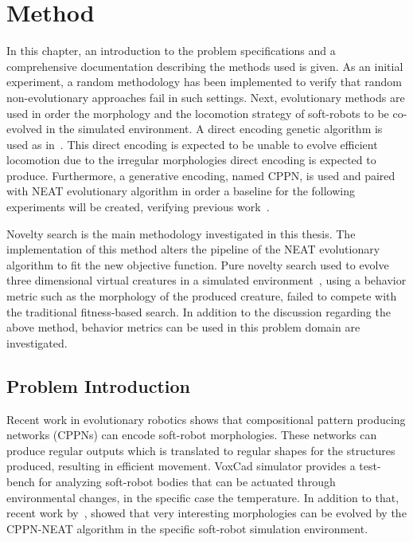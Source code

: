 
\chapter{Method} %

\label{Method} %



In this chapter, an introduction to the problem specifications and a comprehensive documentation describing the methods used is given. As an initial experiment, a random methodology has been implemented to verify that random non-evolutionary approaches fail in such settings. Next, evolutionary methods are used in order the morphology and the locomotion strategy of soft-robots to be co-evolved in the simulated environment. A direct encoding genetic algorithm is used as in~\citep{cheney2013unshackling}. This direct encoding is expected to be unable to evolve efficient locomotion due to the irregular morphologies direct encoding is expected to produce. Furthermore, a generative encoding, named CPPN, is used and paired with NEAT evolutionary algorithm in order a baseline for the following experiments will be created, verifying previous work~\citep{cheney2013unshackling}.

Novelty search is the main methodology investigated in this thesis. The implementation of this method alters the pipeline of the NEAT evolutionary algorithm to fit the new objective function. Pure novelty search used to evolve three dimensional virtual creatures in a simulated environment~\citep{lehman2011evolving}, using a behavior metric such as the morphology of the produced creature, failed to compete with the traditional fitness-based search. In addition to the discussion regarding the above method, behavior metrics can be used in this problem domain are investigated. 



\section{Problem Introduction}

Recent work in evolutionary robotics shows that compositional pattern producing networks (CPPNs) can encode soft-robot morphologies. These networks can produce regular outputs which is translated to regular shapes for the structures produced, resulting in efficient movement. VoxCad simulator provides a test-bench for analyzing soft-robot bodies that can be actuated through environmental changes, in the specific case the temperature. In addition to that, recent work by~\citep{cheney2013unshackling}, showed that very interesting morphologies can be evolved by the CPPN-NEAT algorithm in the specific soft-robot simulation environment.

